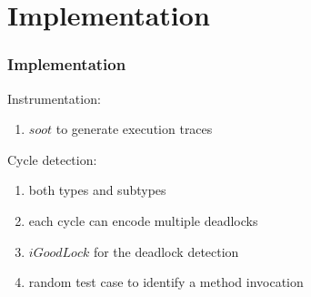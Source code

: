 \documentclass{beamer}
\begin{document}
\section{Implementation}
\begin{frame}
\frametitle{Implementation}
Instrumentation:
 \begin{enumerate}
  \item $soot$ to generate execution traces
 \end{enumerate}
 
Cycle detection:
 \begin{enumerate}
  \item both types and subtypes
  \item each cycle can encode multiple deadlocks
  \item $iGoodLock$ for the deadlock detection
  \item random test case to identify a method invocation
 \end{enumerate}
 
 
\end{frame}
\end{document}
